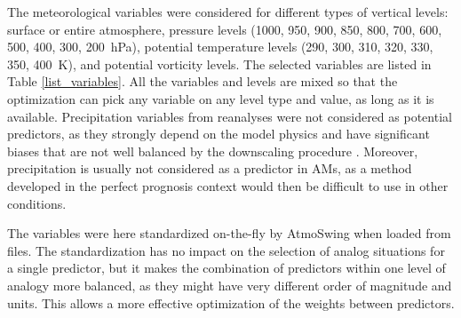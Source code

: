 \documentclass[draft]{agujournal2019}
\begin{document}
The meteorological variables were considered for different types of vertical levels: surface or entire atmosphere, pressure levels (1000, 950, 900, 850, 800, 700, 600, 500, 400, 300, 200~hPa), potential temperature levels (290, 300, 310, 320, 330, 350, 400~K), and potential vorticity levels. The selected variables are listed in Table \ref{list_variables}. All the variables and levels are mixed so that the optimization can pick any variable on any level type and value, as long as it is available. Precipitation variables from reanalyses were not considered as potential predictors, as they strongly depend on the model physics \cite{Rienecker2011} and have significant biases that are not well balanced by the downscaling procedure \cite{Dayon2015}. Moreover, precipitation is usually not considered as a predictor in AMs, as a method developed in the perfect prognosis context would then be difficult to use in other conditions.

The variables were here standardized on-the-fly by AtmoSwing when loaded from files. The standardization has no impact on the selection of analog situations for a single predictor, but it makes the combination of predictors within one level of analogy more balanced, as they might have very different order of magnitude and units. This allows a more effective optimization of the weights between predictors. 
\end{document}
